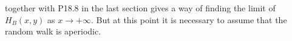 together with P18.8 in the last section gives a way of finding the limit of $H_B(x,y)$ as $x \to +\infty$. But at this point it is necessary to assume that the random walk is aperiodic.